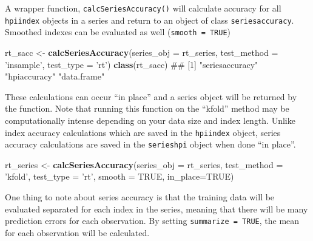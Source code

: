 \documentclass[]{article}
\newenvironment{Shaded}{\begin{snugshade}}{\end{snugshade}}
\newcommand{\KeywordTok}[1]{\textcolor[rgb]{0.13,0.29,0.53}{\textbf{#1}}}
\newcommand{\DataTypeTok}[1]{\textcolor[rgb]{0.13,0.29,0.53}{#1}}
\newcommand{\StringTok}[1]{\textcolor[rgb]{0.31,0.60,0.02}{#1}}
\newcommand{\OtherTok}[1]{\textcolor[rgb]{0.56,0.35,0.01}{#1}}
\newcommand{\OperatorTok}[1]{\textcolor[rgb]{0.81,0.36,0.00}{\textbf{#1}}}
\newcommand{\NormalTok}[1]{#1}
\begin{document}
A wrapper function, \texttt{calcSeriesAccuracy()} will calculate
accuracy for all \texttt{hpiindex} objects in a series and return to an
object of class \texttt{seriesaccuracy}. Smoothed indexes can be
evaluated as well (\texttt{smooth\ =\ TRUE})

\begin{Shaded}
\begin{Highlighting}[]
\NormalTok{  rt_sacc <-}\StringTok{ }\KeywordTok{calcSeriesAccuracy}\NormalTok{(}\DataTypeTok{series_obj =}\NormalTok{ rt_series,}
                                \DataTypeTok{test_method =} \StringTok{'insample'}\NormalTok{,}
                                \DataTypeTok{test_type =} \StringTok{'rt'}\NormalTok{)}
  \KeywordTok{class}\NormalTok{(rt_sacc)}
\NormalTok{## [1] "seriesaccuracy" "hpiaccuracy"    "data.frame"}
\end{Highlighting}
\end{Shaded}

These calculations can occur ``in place'' and a series object will be
returned by the function. Note that running this function on the
``kfold'' method may be computationally intense depending on your data
size and index length. Unlike index accuracy calculations which are
saved in the \texttt{hpiindex} object, series accuracy calculations are
saved in the \texttt{serieshpi} object when done ``in place''.

\begin{Shaded}
\begin{Highlighting}[]
\NormalTok{  rt_series <-}\StringTok{ }\KeywordTok{calcSeriesAccuracy}\NormalTok{(}\DataTypeTok{series_obj =}\NormalTok{ rt_series,}
                                  \DataTypeTok{test_method =} \StringTok{'kfold'}\NormalTok{,}
                                  \DataTypeTok{test_type =} \StringTok{'rt'}\NormalTok{,}
                                  \DataTypeTok{smooth =} \OtherTok{TRUE}\NormalTok{,}
                                  \DataTypeTok{in_place=}\OtherTok{TRUE}\NormalTok{)}
\end{Highlighting}
\end{Shaded}

One thing to note about series accuracy is that the training data will
be evaluated separated for each index in the series, meaning that there
will be many prediction errors for each observation. By setting
\texttt{summarize\ =\ TRUE}, the mean for each observation will be
calculated.

\begin{Shaded}
\end{Shaded}
\end{document}
